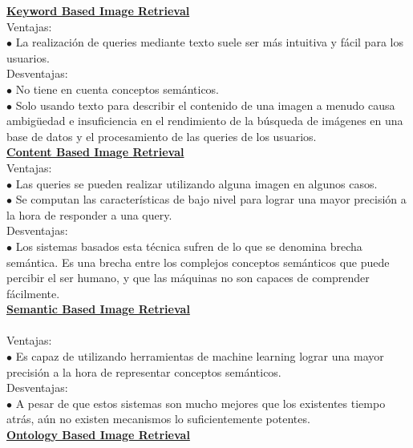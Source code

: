 \documentclass{llncs}
\begin{document}
\underline {\bf Keyword Based Image Retrieval}\\

Ventajas:\\
\noindent$\bullet$ La realizaci\'on de queries mediante texto suele ser m\'as intuitiva y f\'acil para los usuarios.\\

Desventajas:\\
\noindent$\bullet$ No tiene en cuenta conceptos sem\'anticos.\\
$\bullet$ Solo usando texto para describir el contenido de una imagen a menudo causa ambig\"{u}edad e insuficiencia en el rendimiento
de la b\'usqueda de im\'agenes en una base de datos y el procesamiento de las queries de los usuarios.\\

\underline {\bf Content Based Image Retrieval}\\

Ventajas:\\
\noindent$\bullet $ Las queries se pueden realizar utilizando alguna imagen en algunos casos.\\
$\bullet $ Se computan las caracter\'isticas de bajo nivel para lograr una mayor precisi\'on a la hora de responder a una 
query.\\

Desventajas:\\
\noindent$\bullet$ Los sistemas basados esta t\'ecnica sufren de lo que se denomina brecha sem\'antica. Es una brecha 
entre los complejos conceptos sem\'anticos que puede percibir el ser humano, y que las m\'aquinas no son capaces de
comprender f\'acilmente.\\

\underline {\bf Semantic Based Image Retrieval}\\\\

Ventajas:\\
\noindent$\bullet$ Es capaz de utilizando herramientas de machine learning lograr una mayor precisi\'on a la hora de representar conceptos sem\'anticos.\\

Desventajas:\\
$\bullet$ A pesar de que estos sistemas son mucho mejores que los existentes tiempo atr\'as, a\'un no existen mecanismos lo suficientemente potentes.\\

\underline {\bf Ontology Based Image Retrieval}\\\\
\end{document}
